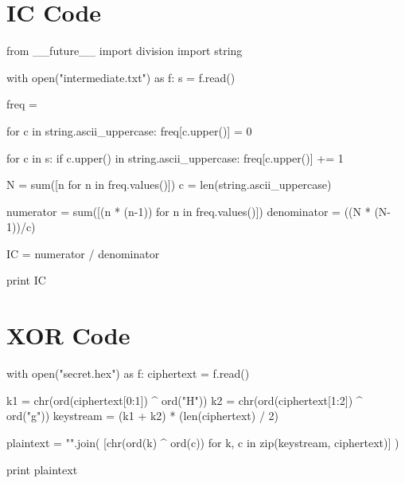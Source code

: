 \documentclass[11pt,a4paper,twoside]{article}
\begin{document}
\vfill
\pagebreak

\section{IC Code}
\label{IC_code}
\begin{python}
from __future__ import division
import string

with open("intermediate.txt") as f: 
    s = f.read()

    freq = {}

    for c in string.ascii_uppercase:
        freq[c.upper()] = 0

    for c in s:
        if c.upper() in string.ascii_uppercase:
            freq[c.upper()] += 1
                           
    N = sum([n for n in freq.values()])
    c = len(string.ascii_uppercase)

    numerator = sum([(n * (n-1)) for n in freq.values()]) 
    denominator = ((N * (N-1))/c)

    IC = numerator / denominator 

    print IC
\end{python}

\section{XOR Code}
\label{XOR_code}
\begin{python}
with open("secret.hex") as f:
    ciphertext = f.read()

    k1 = chr(ord(ciphertext[0:1]) ^ ord("H"))
    k2 = chr(ord(ciphertext[1:2]) ^ ord("g"))
    keystream = (k1 + k2) * (len(ciphertext) / 2)

    plaintext = "".join(
            [chr(ord(k) ^ ord(c)) 
             for k, c in zip(keystream, ciphertext)]
    )

    print plaintext
\end{python}

\vfill
\pagebreak
\end{document}
